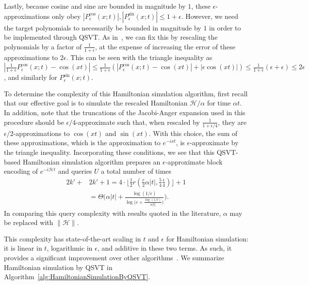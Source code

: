 \documentclass[aps,pra,showpacs,notitlepage,twocolumn,superscriptaddress,nofootinbib]{revtex4-1}
\begin{document}
    
    Lastly, because cosine and sine are bounded in magnitude by $1$, these $\epsilon$-approximations only obey $|P^{\text{cos}}_{\epsilon}(x;t)|, |P^{\text{sin}}_{\epsilon}(x;t)| \leq 1+\epsilon$. However, we need the target polynomials to necessarily be bounded in magnitude by $1$ in order to be implemented through QSVT. As in~\cite{Low_2017}, we can fix this by rescaling the polynomials by a factor of $\frac{1}{1+\epsilon}$, at the expense of increasing the error of these approximations to $2 \epsilon$. This can be seen with the triangle inequality as $ \left|\frac{1}{1+\epsilon} P^{\text{cos}}_{\epsilon}(x;t) - \cos(xt) \right| \leq \frac{1}{1+\epsilon} \left( \left|P^{\text{cos}}_{\epsilon}(x;t) - \cos(xt)\right| + \left|\epsilon \cos(xt) \right| \right) \leq \frac{1}{1+\epsilon}(\epsilon + \epsilon) \leq 2\epsilon $, and similarly for $P^{\text{sin}}_{\epsilon}(x;t)$. 
    
    To determine the complexity of this Hamiltonian simulation algorithm, first recall that our effective goal is to simulate the rescaled Hamiltonian $\mathcal{H}/\alpha$ for time $\alpha t$. In addition, note that the truncations of the Jacobi-Anger expansion used in this procedure should be $\epsilon/4$-approximate such that, when rescaled by $\frac{1}{1+\epsilon/4}$, they are $\epsilon/2$-approximations to $\cos(xt)$ and $\sin(xt)$. With this choice, the sum of these approximations, which is the approximation to $e^{-ixt}$, is $\epsilon$-approximate by the triangle inequality. Incorporating these conditions, we see that this QSVT-based Hamiltonian simulation algorithm prepares an $\epsilon$-approximate block encoding of $e^{-i\mathcal{H}t}$ and queries $U$ a total number of times
    \begin{equation}
        \begin{split}
            2k' + &2k'+1 = 4 \cdot \Bigg\lfloor \frac{1}{2} r\left(\frac{e}{2} \alpha |t|, \frac{5}{4} \frac{\epsilon}{4} \right) \Bigg\rfloor +1 \\ 
            &= \Theta \Bigg( \alpha|t| + \frac{\log(1/\epsilon)}{\log\Big( e+\frac{\log(1/\epsilon)}{\alpha|t|} \Big)}\Bigg).
        \end{split}
    \end{equation}
    In comparing this query complexity with results quoted in the literature, $\alpha$ may be replaced with $\| \mathcal{H}\|$.
    
    This complexity has state-of-the-art scaling in $t$ and $\epsilon$ for Hamiltonian simulation: it is linear in $t$, logarithmic in $\epsilon$, and additive in these two terms. As such, it provides a significant improvement over other algorithms~\cite{Low_2017, Low_2019, Gily_n_2019}. We summarize Hamiltonian simulation by QSVT in Algorithm~\ref{alg:HamiltonianSimulationByQSVT}. 
\end{document}
